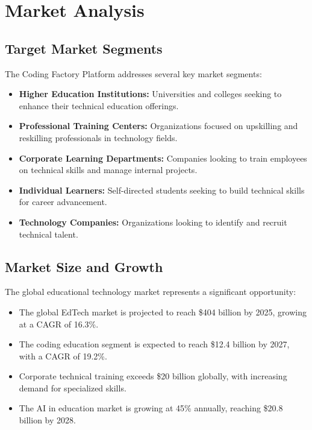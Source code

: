 \documentclass[12pt,a4paper]{report}
\begin{document}
\section{Market Analysis}

\subsection{Target Market Segments}

The Coding Factory Platform addresses several key market segments:

\begin{itemize}
    \item \textbf{Higher Education Institutions:} Universities and colleges seeking to enhance their technical education offerings.

    \item \textbf{Professional Training Centers:} Organizations focused on upskilling and reskilling professionals in technology fields.

    \item \textbf{Corporate Learning Departments:} Companies looking to train employees on technical skills and manage internal projects.

    \item \textbf{Individual Learners:} Self-directed students seeking to build technical skills for career advancement.

    \item \textbf{Technology Companies:} Organizations looking to identify and recruit technical talent.
\end{itemize}

\subsection{Market Size and Growth}

The global educational technology market represents a significant opportunity:

\begin{itemize}
    \item The global EdTech market is projected to reach \$404 billion by 2025, growing at a CAGR of 16.3\%.

    \item The coding education segment is expected to reach \$12.4 billion by 2027, with a CAGR of 19.2\%.

    \item Corporate technical training exceeds \$20 billion globally, with increasing demand for specialized skills.

    \item The AI in education market is growing at 45\% annually, reaching \$20.8 billion by 2028.
\end{itemize}
\end{document}
